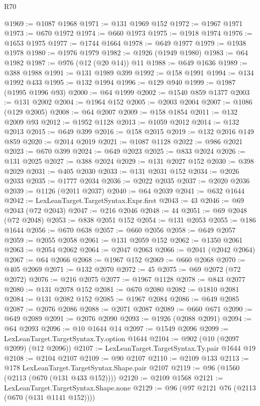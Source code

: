 \begin{lexlean}{R70}
\begin{coremodule}
@1969 := @1087 @1968
@1971 := @131 @1969 @152
@1972 := @1967 @1971
@1973 := @670 @1972
@1974 := @660 @1973
@1975 := @1918 @1974
@1976 := @1653 @1975
@1977 := @1744 @1664
@1978 := @649 @1977
@1979 := @1938 @1978
@1980 := @1976 @1979
@1982 := @1926 (@1949 @1980)
@1983 := @64 @1982
@1987 := @976 (@12 (@20 @14)) @11
@1988 := @649 @1636
@1989 := @388 @1988
@1991 := @131 @1989 @399
@1992 := @158 @1991
@1994 := @134 @1992 @433
@1995 := @132 @1994
@1996 := @129 @940
@1999 := @1987 (@1995 @1996 @93)
@2000 := @64 @1999
@2002 := @1540 @859 @1377
@2003 := @131 @2002
@2004 := @1964 @152
@2005 := @2003 @2004
@2007 := @1086 (@129 @2005)
@2008 := @64 @2007
@2009 := @158 @1854
@2011 := @132 @2009 @93
@2012 := @1952 @1128
@2013 := @1059 @2012
@2014 := @132 @2013
@2015 := @649 @399
@2016 := @158 @2015
@2019 := @132 @2016 @149 @859
@2020 := @2014 @2019
@2021 := @1087 @1128
@2022 := @986 @2021
@2023 := @670 @399
@2024 := @649 @2023
@2025 := @833 @2024
@2026 := @131 @2025
@2027 := @388 @2024
@2029 := @131 @2027 @152
@2030 := @398 @2029
@2031 := @405 @2030
@2033 := @131 @2031 @152
@2034 := @2026 @2033
@2035 := @1777 @2034
@2036 := @2022 @2035
@2037 := @2020 @2036
@2039 := @1126 (@2011 @2037)
@2040 := @64 @2039
@2041 := @632 @1644
@2042 := LexLeanTarget.TargetSyntax.Expr.first
@2043 := 43
@2046 := @69 @2043 (@72 @2043)
@2047 := @216 @2046
@2048 := 44
@2051 := @69 @2048 (@72 @2048)
@2053 := @838 @2051 @152
@2054 := @131 @2053
@2055 := @186 @1644
@2056 := @670 @638
@2057 := @660 @2056
@2058 := @649 @2057
@2059 := @2055 @2058
@2061 := @131 @2059 @152
@2062 := @1350 @2061
@2063 := @2054 @2062
@2064 := @2047 @2063
@2066 := @2041 (@2042 @2064)
@2067 := @64 @2066
@2068 := @1967 @152
@2069 := @660 @2068
@2070 := @405 @2069
@2071 := @132 @2070
@2072 := 45
@2075 := @69 @2072 (@72 @2072)
@2076 := @216 @2075
@2077 := @1967 @1128
@2078 := @843 @2077
@2080 := @131 @2078 @152
@2081 := @670 @2080
@2082 := @1810 @2081
@2084 := @131 @2082 @152
@2085 := @1967 @2084
@2086 := @649 @2085
@2087 := @2076 @2086
@2088 := @2071 @2087
@2089 := @660 @671
@2090 := @649 @2089
@2091 := @2076 @2090
@2093 := @1926 (@2088 @2091)
@2094 := @64 @2093
@2096 := @10 @1644 @14
@2097 := @1549 @2096
@2099 := LexLeanTarget.TargetSyntax.Ty.option @1644
@2104 := @902 (@10 (@2097 @2099) (@12 @2096))
@2107 := LexLeanTarget.TargetSyntax.Ty.pair @1644 @19
@2108 := @2104 @2107
@2109 := @90 @2107
@2110 := @2109 @133
@2113 := @178 LexLeanTarget.TargetSyntax.Shape.pair @2107
@2119 := @96 (@1560 (@2113 (@670 (@131 @433 @152))))
@2120 := @2109 @1568
@2121 := LexLeanTarget.TargetSyntax.Shape.none
@2129 := @96 (@97 @2121 @76 (@2113 (@670 (@131 @1141 @152))))

\end{coremodule}
\end{lexlean}

